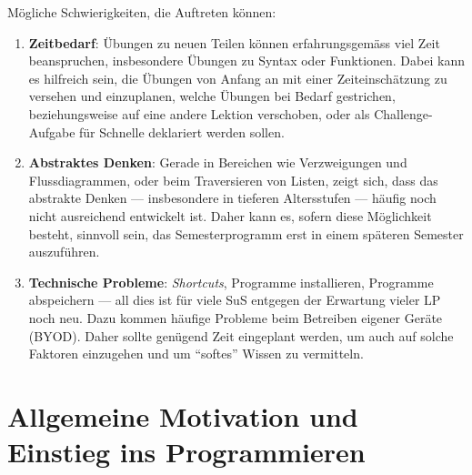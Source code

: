 Mögliche Schwierigkeiten, die Auftreten können:
\begin{enumerate}
	\item \textbf{Zeitbedarf}: Übungen zu neuen Teilen können erfahrungsgemäss viel Zeit beanspruchen, insbesondere Übungen zu Syntax oder Funktionen. Dabei kann es hilfreich sein, die Übungen von Anfang an mit einer Zeiteinschätzung zu versehen und einzuplanen, welche Übungen bei Bedarf gestrichen, beziehungsweise auf eine andere Lektion verschoben, oder als Challenge-Aufgabe für Schnelle deklariert werden sollen.
	\item \textbf{Abstraktes Denken}: Gerade in Bereichen wie Verzweigungen und Flussdiagrammen, oder beim Traversieren von Listen, zeigt sich, dass das abstrakte Denken --- insbesondere in tieferen Altersstufen --- häufig noch nicht ausreichend entwickelt ist. Daher kann es, sofern diese Möglichkeit besteht, sinnvoll sein, das Semesterprogramm erst in einem späteren Semester auszuführen.
	\item \textbf{Technische Probleme}: \textit{Shortcuts}, Programme installieren, Programme abspeichern --- all dies ist für viele SuS entgegen der Erwartung vieler LP noch neu. Dazu kommen häufige Probleme beim Betreiben eigener Geräte (BYOD). Daher sollte genügend Zeit eingeplant werden, um auch auf solche Faktoren einzugehen und um \enquote{softes} Wissen zu vermitteln.
\end{enumerate}

\clearpage

\section{Allgemeine Motivation und Einstieg ins Programmieren}

